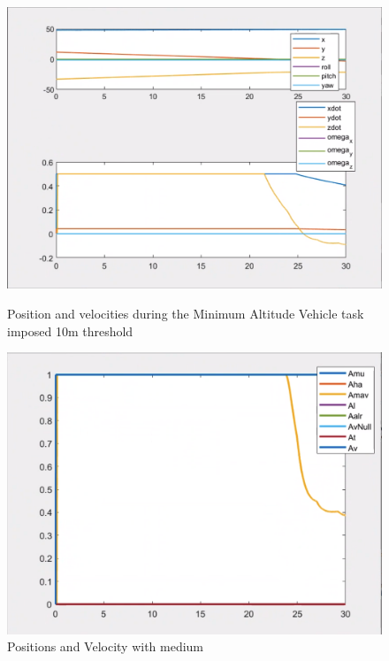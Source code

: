 \documentclass{article}
\begin{document}

\begin{figure}[htpb] 
\begin{minipage}{0.40\textwidth}  
\includegraphics[width=\textwidth]{123_10m_ppdot.png}
\caption{Position and velocities during the Minimum Altitude Vehicle task imposed 10m threshold}\label{10m_ppdot} 
\end{minipage}  
\hspace{0.2\textwidth} 
\begin{minipage}{0.43\textwidth}  
\includegraphics[width=\textwidth]{123_10m_A.png}
\caption{Positions and Velocity with medium}\label{10m_A} 
\end{minipage} 
\end{figure}
\end{document}
